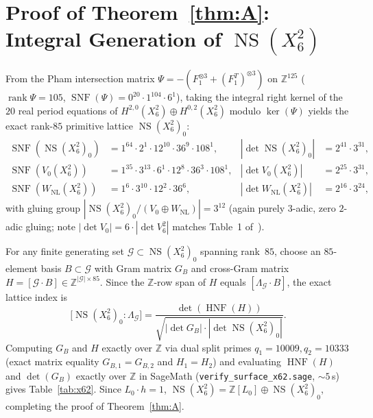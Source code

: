 \documentclass[11pt,a4paper]{amsart}
\theoremstyle{definition}
\newcommand{\ZZ}{\mathbb{Z}}
\newcommand{\NS}{\operatorname{NS}}
\newcommand{\SNF}{\operatorname{SNF}}
\newcommand{\HNF}{\operatorname{HNF}}
\newcommand{\rank}{\operatorname{rank}}
\begin{document}
\section{Proof of Theorem~\ref{thm:A}: Integral Generation of \texorpdfstring{$\NS(X_6^2)$}{NS(X\_6\^{}2)}}

From the Pham intersection matrix $\Psi = -(F_1^{\otimes 3} + (F_1^T)^{\otimes 3})$ on $\ZZ^{125}$ ($\rank \Psi = 105$, $\SNF(\Psi) = 0^{20}\cdot 1^{104}\cdot 6^1$), taking the integral right kernel of the $20$ real period equations of $H^{2,0}(X_6^2) \oplus H^{0,2}(X_6^2)$ modulo $\ker(\Psi)$ yields the exact rank-$85$ primitive lattice $\NS(X_6^2)_0$:
\begin{align*}
  \SNF(\NS(X_6^2)_0) &= 1^{64}\cdot 2^1\cdot 12^{10}\cdot 36^9\cdot 108^1, & |\det \NS(X_6^2)_0| &= 2^{41}\cdot 3^{31}, \\
  \SNF(V_0(X_6^2)) &= 1^{35}\cdot 3^{13}\cdot 6^1\cdot 12^8\cdot 36^3\cdot 108^1, & |\det V_0(X_6^2)| &= 2^{25}\cdot 3^{31}, \\
  \SNF(W_{\mathrm{NL}}(X_6^2)) &= 1^6\cdot 3^{10}\cdot 12^2\cdot 36^6, & |\det W_{\mathrm{NL}}(X_6^2)| &= 2^{16}\cdot 3^{24},
\end{align*}
with gluing group $|\NS(X_6^2)_0 / (V_0 \oplus W_{\mathrm{NL}})| = 3^{12}$ (again purely $3$-adic, zero $2$-adic gluing; note $|\det V_0| = 6 \cdot |\det V_6^2|$ matches Table~1 of~\cite{AMVL19}).

For any finite generating set $\mathcal{G} \subset \NS(X_6^2)_0$ spanning rank~$85$, choose an $85$-element basis $B \subset \mathcal{G}$ with Gram matrix $G_B$ and cross-Gram matrix $H = [\mathcal{G} \cdot B] \in \ZZ^{|\mathcal{G}| \times 85}$. Since the $\ZZ$-row span of $H$ equals $[\Lambda_{\mathcal{G}} \cdot B]$, the exact lattice index is
\begin{equation}\label{eq:index}
  \bigl[\NS(X_6^2)_0 : \Lambda_{\mathcal{G}}\bigr] = \frac{\det(\HNF(H))}{\sqrt{|\det G_B| \cdot |\det \NS(X_6^2)_0|}}.
\end{equation}
Computing $G_B$ and $H$ exactly over $\ZZ$ via dual split primes $q_1 = 10009, q_2 = 10333$ (exact matrix equality $G_{B,1} = G_{B,2}$ and $H_1 = H_2$) and evaluating $\HNF(H)$ and $\det(G_B)$ exactly over $\ZZ$ in SageMath (\texttt{verify\_surface\_x62.sage}, $\sim 5$\,s) gives Table~\ref{tab:x62}. Since $L_0 \cdot h = 1$, $\NS(X_6^2) = \ZZ[L_0] \oplus \NS(X_6^2)_0$, completing the proof of Theorem~\ref{thm:A}.
\end{document}

